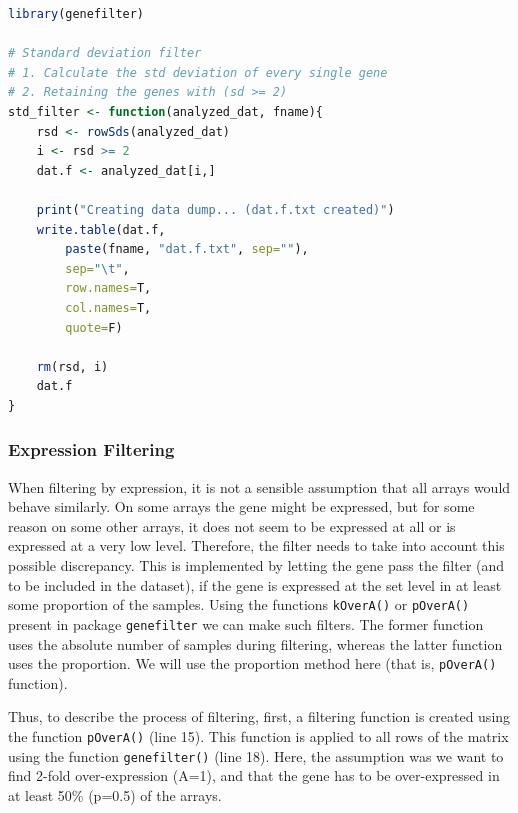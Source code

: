 \documentclass[oneside, a4paper, 11pt]{book}
\begin{document}
\begin{lstlisting}[language=R, caption=Standard Deviation Filtering]
library(genefilter)

# Standard deviation filter
# 1. Calculate the std deviation of every single gene
# 2. Retaining the genes with (sd >= 2)
std_filter <- function(analyzed_dat, fname){
    rsd <- rowSds(analyzed_dat)
    i <- rsd >= 2
    dat.f <- analyzed_dat[i,]

    print("Creating data dump... (dat.f.txt created)")
    write.table(dat.f,
        paste(fname, "dat.f.txt", sep=""),
        sep="\t",
        row.names=T,
        col.names=T,
        quote=F)

    rm(rsd, i)
    dat.f
}
\end{lstlisting}

\subsubsection{Expression Filtering}
When filtering by expression, it is not a sensible assumption that all arrays would behave similarly. On some arrays the gene might be expressed, but for some reason on some other arrays, it does not seem to be expressed at all or is expressed at a very low level. Therefore, the filter needs to take into account this possible discrepancy. This is implemented by letting the gene pass the filter (and to be included in the dataset), if the gene is expressed at the set level in at least some proportion of the samples. Using the functions \texttt{kOverA()} or \texttt{pOverA()} present in package \texttt{genefilter} we can make such filters. The former function uses the absolute number of samples during filtering, whereas the latter function uses the proportion. We will use the proportion method here (that is, \texttt{pOverA()} function).

Thus, to describe the process of filtering, first, a filtering function is created using the function \texttt{pOverA()} (line 15). This function is applied to all rows of the matrix using the function \texttt{genefilter()} (line 18). Here, the assumption was we want to find 2-fold over-expression (A=1), and that the gene has to be over-expressed in at least 50\% (p=0.5) of the arrays.
\end{document}
